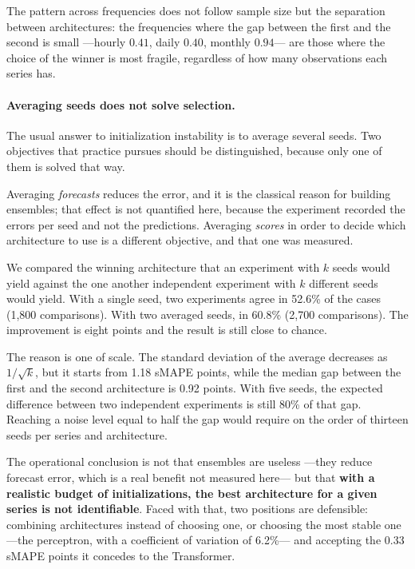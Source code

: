 The pattern across frequencies does not follow sample size but the separation between
architectures: the frequencies where the gap between the first and the second is small
---hourly $0.41$, daily $0.40$, monthly $0.94$--- are those where the choice of the winner
is most fragile, regardless of how many observations each series has.

\paragraph{Averaging seeds does not solve selection.}\label{sec:ensamble}
The usual answer to initialization instability is to average several seeds. Two objectives
that practice pursues should be distinguished, because only one of them is solved that
way.

Averaging \emph{forecasts} reduces the error, and it is the classical reason for building
ensembles; that effect is not quantified here, because the experiment recorded the errors
per seed and not the predictions. Averaging \emph{scores} in order to decide which
architecture to use is a different objective, and that one was measured.

We compared the winning architecture that an experiment with $k$ seeds would yield against
the one another independent experiment with $k$ different seeds would yield. With a single
seed, two experiments agree in 52.6\% of the cases (1{,}800 comparisons). With two
averaged seeds, in 60.8\% (2{,}700 comparisons). The improvement is eight points and the
result is still close to chance.

The reason is one of scale. The standard deviation of the average decreases as
$1/\sqrt{k}$, but it starts from 1.18 sMAPE points, while the median gap between the first
and the second architecture is 0.92 points. With five seeds, the expected difference
between two independent experiments is still 80\% of that gap. Reaching a noise level
equal to half the gap would require on the order of thirteen seeds per series and
architecture.

The operational conclusion is not that ensembles are useless ---they reduce forecast
error, which is a real benefit not measured here--- but that \textbf{with a realistic
budget of initializations, the best architecture for a given series is not identifiable}.
Faced with that, two positions are defensible: combining architectures instead of choosing
one, or choosing the most stable one ---the perceptron, with a coefficient of variation of
6.2\%--- and accepting the 0.33 sMAPE points it concedes to the Transformer.

